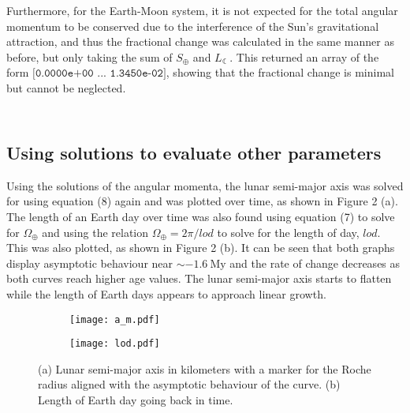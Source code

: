 \documentclass[12pt]{article}
\begin{document}
Furthermore, for the Earth-Moon system, it is not expected for the total angular momentum to be conserved due to the interference of the Sun's gravitational attraction, and thus the fractional change was calculated in the same manner as before, but only taking the sum of $S_{\oplus}$ and $L_{\leftmoon}$. This returned an array of the form $\texttt{[0.0000e+00 ... 1.3450e-02]}$, showing that the fractional change is minimal but cannot be neglected.

$\ $

$\ $

\subsection{Using solutions to evaluate other parameters}
Using the solutions of the angular momenta, the lunar semi-major axis was solved for using equation (8) again and was plotted over time, as shown in Figure 2 (a). The length of an Earth day over time was also found using equation (7) to solve for $\Omega_{\oplus}$ and using the relation $\Omega_\oplus = 2 \pi / lod $ to solve for the length of day, $lod$. This was also plotted, as shown in Figure 2 (b). It can be seen that both graphs display asymptotic behaviour near $\sim -1.6 \ \text{My}$ and the rate of change decreases as both curves reach higher age values. The lunar semi-major axis starts to flatten while the length of Earth days appears to approach linear growth.

\begin{figure*}[h]
        \centering
        \begin{subfigure}[b]{0.47\textwidth}
            \centering
            \texttt{[image: a\_m.pdf]}
            \caption[]%
            {{\small }}    
            \label{fig:mean and std of net14}
        \end{subfigure}
        \begin{subfigure}[b]{0.48\textwidth}   
            \centering 
            \texttt{[image: lod.pdf]}
            \caption[]%
            {{\small }}    
        \end{subfigure}
        \caption[]%
        {\small (a) Lunar semi-major axis in kilometers with a marker for the Roche radius aligned with the asymptotic behaviour of the curve. (b) Length of Earth day going back in time.} 
    \end{figure*}
\end{document}
